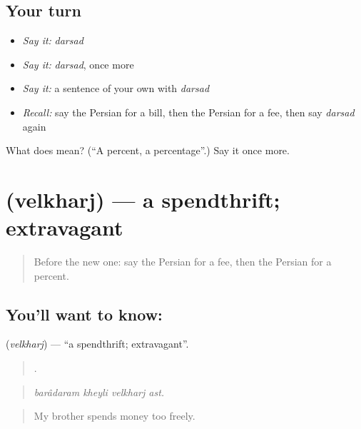 \subsection*{Your turn}
\begin{itemize}
\raggedright
  \item \emph{Say it:} \emph{darsad}
  \item \emph{Say it:} \emph{darsad}, once more
  \item \emph{Say it:} a sentence of your own with \emph{darsad}
  \item \emph{Recall:} say the Persian for a bill, then the Persian for a fee, then say \emph{darsad} again
\end{itemize}

\begin{tcolorbox}[breakable,colback=teal!4,colframe=teal!35!black,title={Before you move on}]
What does  mean? (\textquotedblleft{}A percent, a percentage\textquotedblright{}.) Say it once more.
\end{tcolorbox}
\section[\texorpdfstring{\fa{ولخرج} (velkharj)}{ولخرج (velkharj)}]{ (velkharj) — a spendthrift; extravagant}

\label{lesson:FA-C415-velkharj}



\begin{quote}
Before the new one: say the Persian for a fee, then the Persian for a percent.
\end{quote}

\subsection*{You'll want to know: }
\textbf{} (\emph{velkharj}) — \textquotedblleft{}a spendthrift; extravagant\textquotedblright{}.

\begin{quote}
   .
\end{quote}

\begin{quote}
\emph{barâdaram kheyli velkharj ast.}
\end{quote}

\begin{quote}
My brother spends money too freely.
\end{quote}

